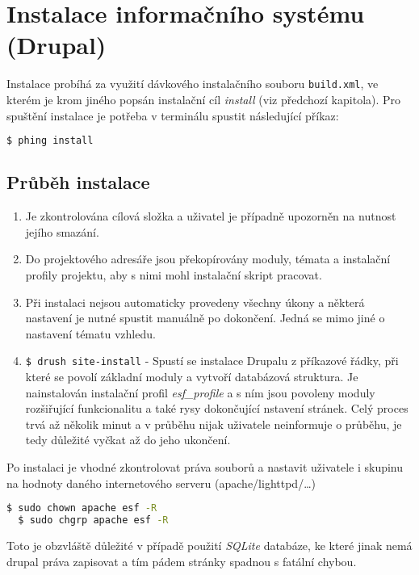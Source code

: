 \section{Instalace informačního systému (Drupal)}
Instalace probíhá za využití dávkového instalačního souboru \texttt{build.xml}, ve kterém je krom jiného popsán instalační cíl \emph{install} (viz předchozí kapitola). Pro spuštění instalace je potřeba v terminálu spustit následující příkaz:

\begin{lstlisting}[language=bash]
  $ phing install
\end{lstlisting}

\subsection*{Průběh instalace}

\begin{enumerate}
  \item Je zkontrolována cílová složka a uživatel je případně upozorněn na nutnost jejího smazání.
 
  \item Do projektového adresáře jsou překopírovány moduly, témata a instalační profily projektu, aby s nimi mohl instalační skript pracovat.
  \item Při instalaci nejsou automaticky provedeny všechny úkony a některá nastavení je nutné spustit manuálně po dokončení. Jedná se mimo jiné o nastavení tématu vzhledu.
  \item \lstinline[language=bash]{$ drush site-install} - Spustí se instalace Drupalu z příkazové řádky, při které se povolí základní moduly a vytvoří databázová struktura. Je nainstalován instalační profil \emph{esf\_profile} a s ním jsou povoleny moduly rozšiřující funkcionalitu a také rysy dokončující nstavení stránek. Celý proces trvá až několik minut a v průběhu nijak uživatele neinformuje o průběhu, je tedy důležité vyčkat až do jeho ukončení.
\end{enumerate}

Po instalaci je vhodné zkontrolovat práva souborů a nastavit uživatele i skupinu na hodnoty daného internetového serveru (apache/lighttpd/\dots)

\begin{lstlisting}[language=bash]
  $ sudo chown apache esf -R 
  $ sudo chgrp apache esf -R
\end{lstlisting}

Toto je obzvláště důležité v případě použití \emph{SQLite} databáze, ke které jinak nemá drupal práva zapisovat a tím pádem stránky spadnou s fatální chybou. 

